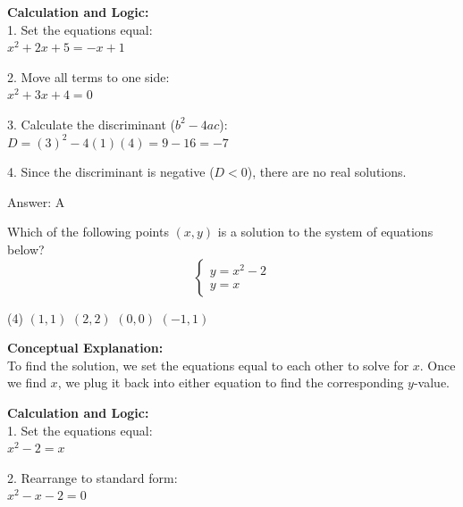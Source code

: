 \documentclass[11pt,paper=a4,answers]{exam}
\begin{document}
\begin{questions}
\begin{solution}
\vspace{20pt}

\textbf{Calculation and Logic:} \\
1. Set the equations equal: \\
   $x^2 + 2x + 5 = -x + 1$

\vspace{10pt}

2. Move all terms to one side: \\
   $x^2 + 3x + 4 = 0$

\vspace{10pt}

3. Calculate the discriminant ($b^2 - 4ac$): \\
   $D = (3)^2 - 4(1)(4) = 9 - 16 = -7$

\vspace{10pt}

4. Since the discriminant is negative ($D < 0$), there are no real solutions.

\vspace{25pt}

Answer: \colorbox{yellow!100}{A}
\end{solution}

\question
Which of the following points $(x, y)$ is a solution to the system of equations below?
\[ \begin{cases} y = x^2 - 2 \\ y = x \end{cases} \]
\begin{tasks}(4)
    \task $(1, 1)$
    \task $(2, 2)$
    \task $(0, 0)$
    \task $(-1, 1)$
\end{tasks}

\begin{solution}
\textbf{Conceptual Explanation:} \\
To find the solution, we set the equations equal to each other to solve for $x$. Once we find $x$, we plug it back into either equation to find the corresponding $y$-value.

\vspace{20pt}

\textbf{Calculation and Logic:} \\
1. Set the equations equal: \\
   $x^2 - 2 = x$

\vspace{10pt}

2. Rearrange to standard form: \\
   $x^2 - x - 2 = 0$


\end{solution}
\end{questions}
\end{document}
